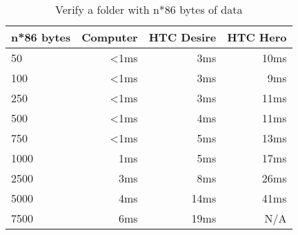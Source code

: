 \begin{table}
  \centering
  \caption{Verify a folder with n*86 bytes of data}
  \begin{tabular}{ | l | r | r | r |}
    \hline
    \textbf{n*86 bytes} & \textbf{Computer} & \textbf{HTC Desire} & \textbf{HTC Hero} \\ \hline
    50      & <1ms    &3ms  & 10ms    \\ \hline
    100     & <1ms    &3ms  &  9ms    \\ \hline
    250     & <1ms    &3ms  & 11ms    \\ \hline   
    500     & <1ms    &4ms  & 11ms    \\ \hline
    750     & <1ms    &5ms  & 13ms    \\ \hline
    1000    &  1ms    &5ms  & 17ms    \\ \hline
    2500    &  3ms    &8ms  & 26ms    \\ \hline     
    5000    &  4ms    &14ms & 41ms    \\ \hline 
    7500    &  6ms    &19ms & N/A   \\ \hline 
  \end{tabular}
  \label{tbl:folder:verify}
\end{table}
